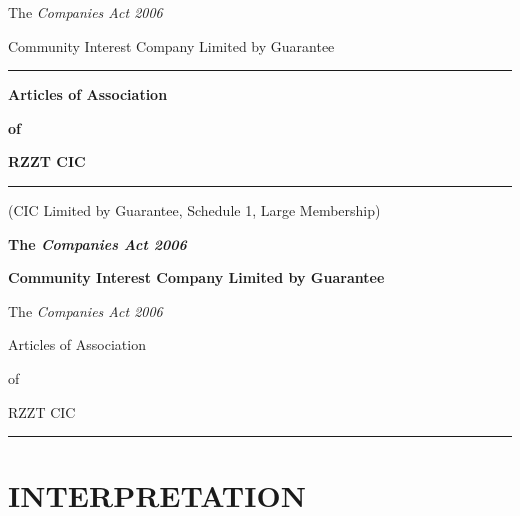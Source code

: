 \documentclass[a4paper,12pt]{article}
\begin{document}

\vspace*{\fill}

\begin{center}

The \textit{Companies Act 2006}

\vspace{1em}

Community Interest Company Limited by Guarantee

\vspace{\fill}

\hrule

\vspace{1em}

\textbf{Articles of Association}

\textbf{of}

\textbf{RZZT CIC}

\vspace{1em}

\hrule

\vspace{\fill}

(CIC Limited by Guarantee, Schedule 1, Large Membership)

\vspace{\fill}

\end{center}

\newpage

\begin{center}
\textbf{The \textit{Companies Act 2006}}

\textbf{Community Interest Company Limited by Guarantee}
\end{center}

\tableofcontents

\newpage

\begin{center}
The \textit{Companies Act 2006}\par Articles of Association\par of\par RZZT CIC
\end{center}

\vspace{2em}

\hrule

\part*{INTERPRETATION}
\end{document}
